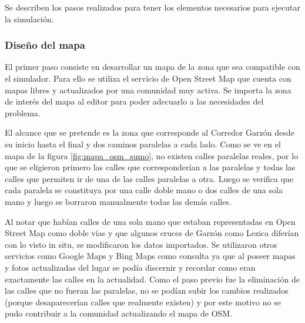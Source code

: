 Se describen los pasos realizados para tener los elementos necesarios para ejecutar la simulación.

\subsubsection{Diseño del mapa}

El primer paso consiste en desarrollar un mapa de la zona que sea compatible con el simulador. Para ello se utiliza el servicio de Open Street Map \citep{OSM} que cuenta con mapas libres y actualizados por una comunidad muy activa. Se importa la zona de interés del mapa al editor \citet{JOSM} para poder adecuarlo a las necesidades del problema. 

El alcance que se pretende es la zona que corresponde al Corredor Garzón desde su inicio hasta el final y dos caminos paralelas a cada lado.
Como se ve en el mapa de la figura \ref{fig:mapa_osm_sumo}, no existen calles paralelas reales, por lo que se eligieron primero las calles que corresponderían a las paralelas y todas las calles que permiten ir de una de las calles paralelas a otra. Luego se verifica que cada paralela se constituya por una calle doble mano o dos calles de una sola mano y luego se borraron manualmente todas las demás calles.

Al notar que habían calles de una sola mano que estaban representadas en Open Street Map como doble vías y que algunos cruces de Garzón como Lezica diferían con lo visto in situ, se modificaron los datos importados. Se utilizaron otros servicios como Google Maps y Bing Maps como consulta ya que al poseer mapas y fotos actualizadas del lugar se podía discernir y recordar como eran exactamente las calles en la actualidad. Como el paso previo fue la eliminación de las calles que no fueran las paralelas, no se podían subir los cambios realizados (porque desaparecerían calles que realmente existen) y por este motivo no se pudo contribuir a la comunidad actualizando el mapa de OSM.

